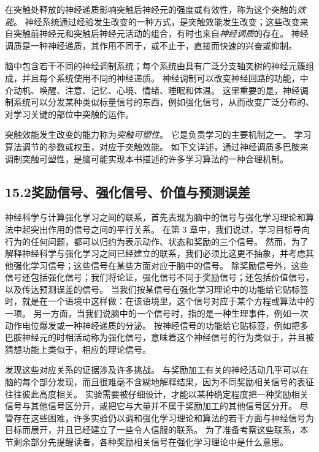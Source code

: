 \documentclass[UTF8, 12pt, fontset=fandol, oneside]{ctexart}
\begin{document}
在突触处释放的神经递质影响突触后神经元的强度或有效性，称为这个突触的\emph{效能}。
神经系统通过经验发生改变的一种方式，是突触效能发生改变；这些改变来自突触前神经元和突触后神经元活动的组合，有时也来自\emph{神经调质}的存在。
神经调质是一种神经递质，其作用不同于，或不止于，直接而快速的兴奋或抑制。

脑中包含若干不同的神经调制系统；每个系统由具有广泛分支轴突树的神经元簇组成，并且每个系统使用不同的神经递质。
神经调制可以改变神经回路的功能，中介动机、唤醒、注意、记忆、心境、情绪、睡眠和体温。
这里重要的是，神经调制系统可以分发某种类似标量信号的东西，例如强化信号，从而改变广泛分布的、对学习关键的部位中突触的运作。

突触效能发生改变的能力称为\emph{突触可塑性}。
它是负责学习的主要机制之一。
学习算法调节的参数或权重，对应于突触效能。
如下文详述，通过神经调质多巴胺来调制突触可塑性，是脑可能实现本书描述的许多学习算法的一种合理机制。

\subsection*{15.2\quad 奖励信号、强化信号、价值与预测误差}

神经科学与计算强化学习之间的联系，首先表现为脑中的信号与强化学习理论和算法中起突出作用的信号之间的平行关系。
在第 3 章中，我们说过，学习目标导向行为的任何问题，都可以归约为表示动作、状态和奖励的三个信号。
然而，为了解释神经科学与强化学习之间已经建立的联系，我们必须比这更不抽象，并考虑其他强化学习信号；这些信号在某些方面对应于脑中的信号。
除奖励信号外，这些信号还包括强化信号；我们将论证，强化信号不同于奖励信号；还包括价值信号，以及传达预测误差的信号。
当我们按某信号在强化学习理论中的功能给它贴标签时，就是在一个语境中这样做：在该语境里，这个信号对应于某个方程或算法中的一项。
另一方面，当我们说脑中的一个信号时，指的是一种生理事件，例如一次动作电位爆发或一种神经递质的分泌。
按神经信号的功能给它贴标签，例如把多巴胺神经元的时相活动称为强化信号，意味着这个神经信号的行为类似于，并且被猜想功能上类似于，相应的理论信号。

发现这些对应关系的证据涉及许多挑战。
与奖励加工有关的神经活动几乎可以在脑的每个部分发现，而且很难毫不含糊地解释结果，因为不同奖励相关信号的表征往往彼此高度相关。
实验需要被仔细设计，才能以某种确定程度把一种奖励相关信号与其他信号区分开，或把它与大量并不属于奖励加工的其他信号区分开。
尽管存在这些困难，许多实验仍以调和强化学习理论和算法的若干方面与神经信号为目标而展开，并且已经建立了一些令人信服的联系。
为了准备考察这些联系，本节剩余部分先提醒读者，各种奖励相关信号在强化学习理论中是什么意思。
\end{document}
